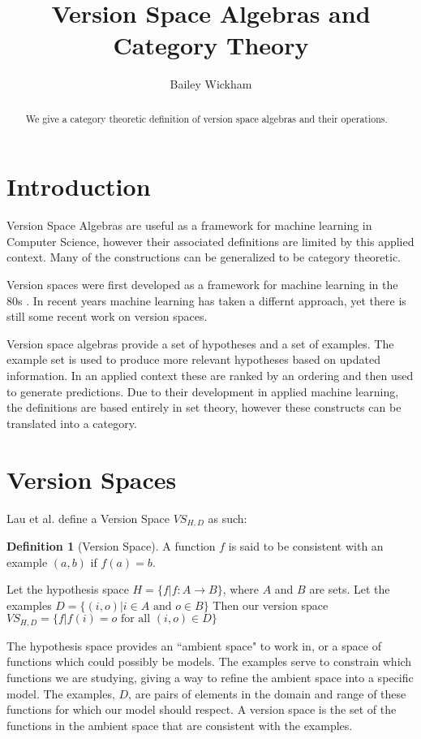 \documentclass{article}
\title{Version Space Algebras and Category Theory}
\author{Bailey Wickham}
\theoremstyle{definition}
\newtheorem{definition}{Definition}[section]
\begin{document}
\maketitle

\begin{abstract}
We give a category theoretic definition of version space algebras and their operations. 
\end{abstract}

\section{Introduction}
Version Space Algebras are useful as a framework for machine learning in Computer Science, however their associated definitions are limited by this applied context. Many of the constructions can be generalized to be category theoretic. 
                    
Version spaces were first developed as a framework for machine learning in the 80s \cite{original}. In recent years machine learning has taken a differnt approach, yet there is still some recent work on version spaces.

Version space algebras provide a set of hypotheses and a set of examples. The example set is used to produce more relevant hypotheses based on updated information. In an applied context these are ranked by an ordering and then used to generate predictions. Due to their development in applied machine learning, the definitions are based entirely in set theory, however these constructs can be translated into a category. 

\section{Version Spaces}
Lau et al.\cite{short}  define a Version Space $VS_{H,D}$ as such: 

\begin{definition}[Version Space] 
A function $f$ is said to be consistent with an example $(a,b)$ if $f(a) = b$. 

Let the hypothesis space $H = \{f | f: A \rightarrow B \}$, where $A$ and $B$ are sets. Let the examples $D = \{(i, o) | i \in A \text{ and } o \in B\}$ Then our version space $VS_{H,D}= \{f | f(i) = o \text{ for all } (i,o) \in D\}$
\end{definition}

The hypothesis space provides an ``ambient space" to work in, or a space of functions which could possibly be models. The examples serve to constrain which functions we are studying, giving a way to refine the ambient space into a specific model.  The examples, $D$, are pairs of elements in the domain and range of these functions for which our model should respect. A version space is the set of the functions in the ambient space that are consistent with the examples. 
\end{document}
